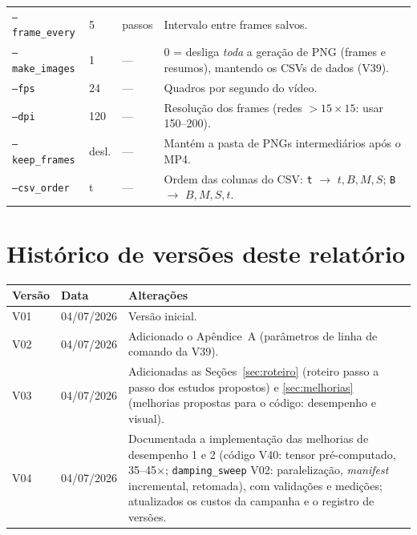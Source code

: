 \documentclass[11pt,a4paper]{article}
\newcommand{\code}[1]{\texttt{#1}}
\begin{document}
\begin{longtable}{@{}lll p{7.6cm}@{}}
\code{--frame\_every} & 5 & passos & Intervalo entre frames salvos. \\
\code{--make\_images} & 1 & --- & 0 = desliga \emph{toda} a geração de
PNG (frames e resumos), mantendo os CSVs de dados (V39). \\
\code{--fps} & 24 & --- & Quadros por segundo do vídeo. \\
\code{--dpi} & 120 & --- & Resolução dos frames (redes $>15\times15$:
usar 150--200). \\
\code{--keep\_frames} & desl. & --- & Mantém a pasta de PNGs
intermediários após o MP4. \\
\code{--csv\_order} & t & --- & Ordem das colunas do CSV: \code{t}
$\to$ $t,B,M,S$; \code{B} $\to$ $B,M,S,t$. \\
\end{longtable}
\endgroup

\section*{Histórico de versões deste relatório}

\begin{tabular}{@{}lll@{}}
\toprule
\textbf{Versão} & \textbf{Data} & \textbf{Alterações} \\
\midrule
V01 & 04/07/2026 & Versão inicial. \\
V02 & 04/07/2026 & Adicionado o Apêndice~A (parâmetros de linha de
comando da V39). \\
V03 & 04/07/2026 & Adicionadas as Seções~\ref{sec:roteiro} (roteiro
passo a passo dos estudos propostos) e \ref{sec:melhorias} (melhorias
propostas para o código: desempenho e visual). \\
V04 & 04/07/2026 & Documentada a implementação das melhorias de
desempenho 1 e 2 (código V40: tensor pré-computado, 35--45$\times$;
\code{damping\_sweep} V02: paralelização, \emph{manifest} incremental,
retomada), com validações e medições; atualizados os custos da campanha
e o registro de versões. \\
\bottomrule
\end{tabular}
\end{document}
